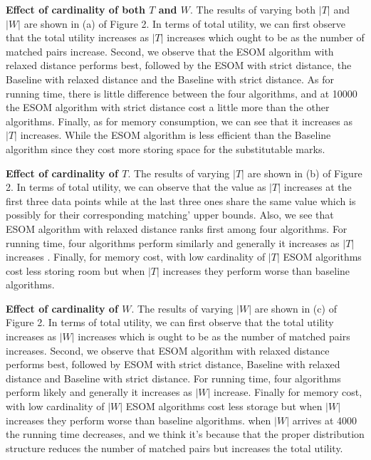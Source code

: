 \documentclass[color,twoside,amssymb,twocolumn]{article}
\begin{document}


\textbf{Effect of cardinality of both $T$ and $W$}. The results of varying both $|T|$ and $|W|$ are shown in (a) of Figure 2. In terms of total utility, we can first observe that the total utility increases as $|T|$ increases which ought to be as the number of matched pairs increase. Second, we observe that the ESOM algorithm with relaxed distance performs best, followed by the ESOM with strict distance, the Baseline with relaxed distance and the Baseline with strict distance. As for running time, there is little difference between the four algorithms, and at 10000 the ESOM algorithm with strict distance cost a little more than the other algorithms. Finally, as for memory consumption, we can see that it increases as $|T|$ increases. While the ESOM algorithm is less efficient than the Baseline algorithm since they cost more storing space for the substitutable marks.


\textbf{Effect of cardinality of $T$}. The results of varying $|T|$ are shown in (b) of Figure 2. In terms of total utility, we can observe that the value as $|T|$ increases at the first three data points while at the last three ones share the same value which is possibly for their corresponding matching' upper bounds. Also, we see that ESOM algorithm with relaxed distance ranks first among four algorithms. For running time, four algorithms perform similarly and generally it increases as $|T|$ increases . Finally, for memory cost, with low cardinality of $|T|$ ESOM algorithms cost less storing room but when $|T|$ increases they perform worse than baseline algorithms.

\textbf{Effect of cardinality of $W$}. The results of varying $|W|$ are shown in (c) of Figure 2. In terms of total utility, we can first observe that the total utility increases as $|W|$ increases which is ought to be as the number of matched pairs increases. Second, we observe that ESOM algorithm with relaxed distance performs best, followed by ESOM with strict distance, Baseline with relaxed distance and Baseline with strict distance. For running time, four algorithms perform likely and generally it increases as $|W|$ increase. Finally for memory cost, with low cardinality of $|W|$ ESOM algorithms cost less storage but when $|W|$ increases they perform worse than baseline algorithms. when $|W|$ arrives at 4000 the running time decreases, and we think it’s because that the proper distribution structure reduces the number of matched pairs but increases the total utility.
\end{document}

